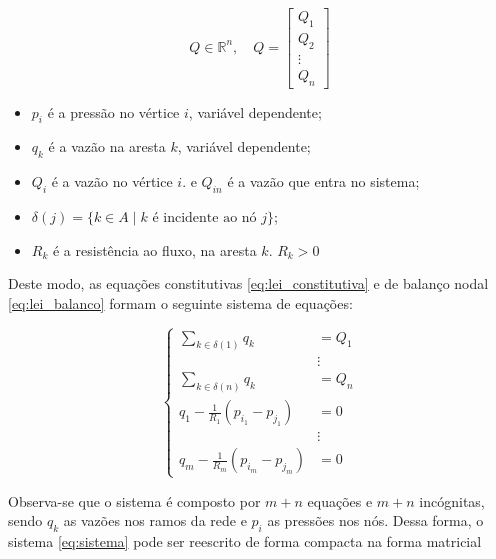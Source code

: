 \documentclass{article}
\begin{document}
\[
Q \in \mathbb{R}^n, \quad
Q =
\begin{bmatrix}
Q_1 \\
Q_2 \\
\vdots \\
Q_n
\end{bmatrix}
\]

\begin{itemize}
    \item $p_i$ é a pressão no vértice $i$, variável dependente;
    
    \item $q_k$ é a vazão na aresta $k$, variável dependente; 

    \item $Q_i$ é a vazão no vértice $i$. e $Q_{in}$ é a vazão que entra no sistema; 
    
    \item $\delta(j) = \{ k \in A \mid k \text{ é incidente ao nó } j \}$;
    

    \item $R_k$ é a resistência ao fluxo, na aresta $k$. $R_k >0$

\end{itemize}

Deste modo, as equações constitutivas \eqref{eq:lei_constitutiva} e de balanço nodal \eqref{eq:lei_balanco} formam o seguinte sistema de equações:

\begin{equation}
\left\{
\begin{aligned}
    \sum_{k \in \delta(1)} q_k &= Q_1 \\
    &\vdots \\
    \sum_{k \in \delta(n)} q_k &= Q_n \\
    q_1 - \frac{1}{R_1}(p_{i_1} - p_{j_1}) &= 0 \\
    &\vdots \\
    q_m - \frac{1}{R_m}(p_{i_m} - p_{j_m}) &= 0
\end{aligned}
\right.
\label{eq:sistema}
\end{equation}

Observa-se que o sistema é composto por \(m+n\) equações e \(m+n\) incógnitas, sendo \(q_k\) as vazões nos ramos da rede e \(p_i\) as pressões nos nós. Dessa forma, o sistema \eqref{eq:sistema} pode ser reescrito de forma compacta na forma matricial
\end{document}
